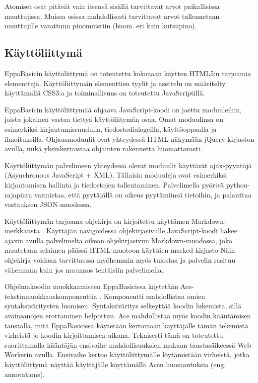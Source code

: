 Atomiset osat pitävät vain
itsensä sisällä tarvittavat
arvot paikallisissa muuttujissa.
Muissa osissa mahdollisesti tarvittavat
arvot tallennetaan muuttujille
varattuun pinomuistiin
(huom. eri kuin kutsupino).


\subsection{Käyttöliittymä}
EppaBasicin käyttöliittymä on toteutettu
kokonaan käytten HTML5:n tarjoamia elementtejä.
Käyttöliittymän elementtien tyylit ja asettelu
on määritelty käyttämällä CSS3:a ja
toiminallisuus on toteutettu
JavaScriptillä.

EppaBasicin käyttöliittymää ohjaava JavaScript-koodi
on jaettu moduuleihin, joista jokainen vastaa
tiettyä käyttöliitymän osaa.
Omat moduulinsa on esimerkiksi kirjautumisruudulla,
tiedostodialogeilla, käyttöoppaalla ja ilmoituksilla.
Ohjausmoduulit ovat yhteydessä HTML-näkymään
jQuery-kirjaston \cite{jquery} avulla,
mikä yksinkertaistaa ohjainten rakennetta huomattavasti.

Käyttöliittymän palvelimeen yhteydessä olevat
moduulit käyttävät ajax-pyyntöjä
(Asyn\-chro\-nous JavaScript + XML).
Tällaisia moduuleja ovat esimerkiksi
kirjautumisen hallinta ja tiedostojen tallentaminen.
Palvelimella pyörivä python-rajapinta varmistaa,
että pyytäjällä on oikeus pyytämiinsä tietoihin,
ja palauttaa vastauksen JSON-muodossa.

Käyttöliittymän tarjoama ohjekirja on kirjoitettu
käyttämen Markdown-merkkausta \cite{markdown}.
Käyttäjän navigoidessa ohjekirjasivulle
JavaScript-koodi hakee ajaxin avulla palvelimelta
oikean ohjekirjasivun Markdown-muodossa,
joka muutetaan selaimen päässä HTML-muotoon käyttäen
marked-kirjasto \cite{marked}
Näin ohjekirja voidaan tarvittaessa myöhemmin
myös tulostaa ja palvelin rasituu vähemmän
kuin jos muunnos tehtäisiin palvelimella.

Ohjelmakoodin muokkaamiseen EppaBasicissa käytetään
Ace-teks\-tin\-muok\-kaus\-kom\-po\-nent\-tia \cite{ace_about}.
Komponentti mahdollistaa omien syntaksiväritysten luomisen.
Syntaksiväritys selkeyttää koodin lukemista,
sillä avainsanojen erottaminen helpottuu.
Ace mahdollistaa myös koodin kääntämisen taustalla,
mitä EppaBasicissa käytetään kertomaan käyttäjälle
tämän tekemistä virheistä jo koodin kirjoittamisen aikana.
Teknisesti tämä on toteutettu suorittamalla
kääntäjän ensivaihe mahdollisuuksien mukaan
taustasäikeessä Web Workerin \cite{w3c_web_worker} avulla.
Ensivaihe kertoo käyttöliittymälle löytämistään virheistä,
jotka käyttöliittymä näyttää käyttäjälle käyttämällä
Acen huomautuksia (eng. annotations).


